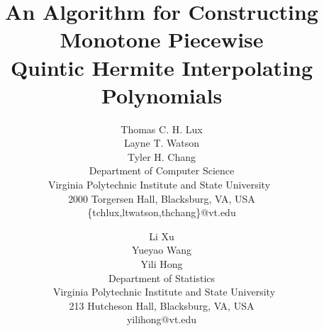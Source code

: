 \documentclass{scspaperproc}
\theoremstyle{scsthe}
\begin{document}
%



\def\SCSconferenceacro{SpringSim'20}

\def\SCSpublicationyear{2020}

\def\SCSconferencedates{May 19-May 21}

\def\SCSconferencevenue{Fairfax, VA, USA}

\title{An Algorithm for Constructing Monotone Piecewise \\ Quintic Hermite Interpolating Polynomials}

\author{
Thomas C. H. Lux\\
Layne T. Watson\\
Tyler H. Chang\\ [12pt]
Department of Computer Science\\
Virginia Polytechnic Institute and State University $\,$\\
2000 Torgersen Hall, Blacksburg, VA, USA\\
\{tchlux,ltwatson,thchang\}@vt.edu\\
\and
Li Xu\\%
Yueyao Wang\\%
Yili Hong\\ [12pt]
Department of Statistics\\
$\,$ Virginia Polytechnic Institute and State University\\
213 Hutcheson Hall, Blacksburg, VA, USA\\
yilihong@vt.edu\\
}
\end{document}
